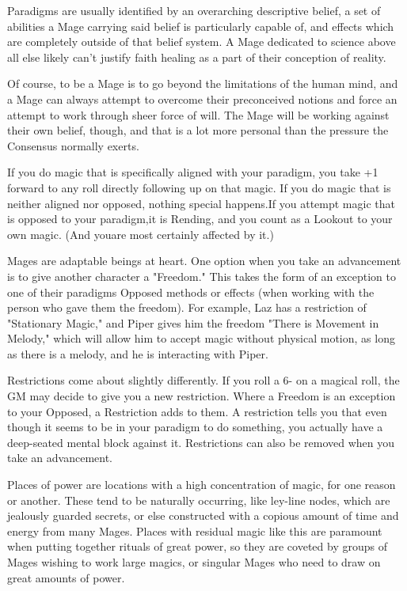 \documentclass[letterpaper,12pt]{article}
\newcommand{\SECTION}[1]{\vspace{.5em}{\noindent\titlefont\large\textbf{#1}}

}
\begin{document}
Paradigms are usually identified by an overarching descriptive belief,
a set of abilities a Mage carrying said belief is particularly capable
of, and effects which are completely outside of that belief system. A
Mage dedicated to science above all else likely can't justify faith
healing as a part of their conception of reality.

Of course, to be a Mage is to go beyond the limitations of the human
mind, and a Mage can always attempt to overcome their preconceived
notions and force an attempt to work through sheer force of will. The
Mage will be working against their own belief, though, and that is a
lot more personal than the pressure the Consensus normally exerts.

If you do magic that is specifically aligned with your paradigm, you
take +1 forward to any roll directly following up on that magic. If you
do magic that is neither aligned nor opposed, nothing special happens.If 
you attempt magic that is opposed to your paradigm,it is Rending, and 
you count as a Lookout to your own magic. (And youare most certainly 
affected by it.)

\SECTION{Freedoms and Restrictions}
Mages are adaptable beings at heart. One option when you take an
advancement is to give another character a "Freedom." This takes the
form of an exception to one of their paradigms Opposed methods or 
effects (when working with the person who gave them the freedom). 
For example, Laz has a restriction of "Stationary Magic," and Piper
gives him the freedom "There is Movement in Melody," which will allow
him to accept magic without physical motion, as long as there is a 
melody, and he is interacting with Piper.

Restrictions come about slightly differently. If you roll a 6- on a
magical roll, the GM may decide to give you a new restriction. Where a
Freedom is an exception to your Opposed, a Restriction adds to them. 
A restriction tells you that even though it seems to be in your paradigm 
to do something, you actually have a deep-seated mental block against it.
Restrictions can also be removed when you take an advancement.

\SECTION{Place of Power}
Places of power are locations with a high concentration of magic, for
one reason or another. These tend to be naturally occurring, like
ley-line nodes, which are jealously guarded secrets, or else
constructed with a copious amount of time and energy from many
Mages. Places with residual magic like this are paramount when putting
together rituals of great power, so they are coveted by groups of
Mages wishing to work large magics, or singular Mages who need to draw
on great amounts of power.
\end{document}

